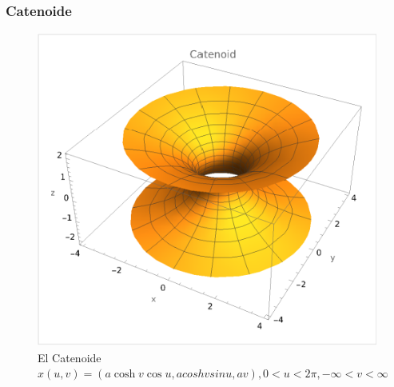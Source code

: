 \documentclass[10pt]{beamer}
\begin{document}
      
      \begin{frame}
      \frametitle{Catenoide}
      \begin{figure}
      \includegraphics[scale=0.4]{imagenes/1.png}
      \caption{El Catenoide $x(u, v) = (a\cosh v \cos u, acosh v sin u, av),
      0<u<2\pi, -\infty<v<\infty$}
      \end{figure}
      \end{frame}
\end{document}
